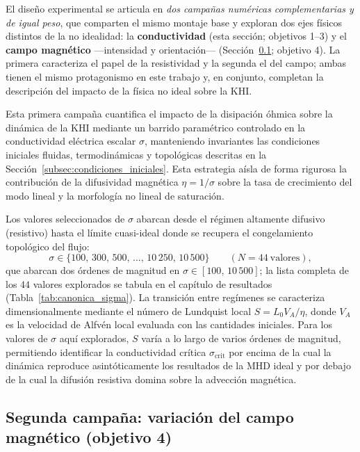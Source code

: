 \primerparrafo El diseño experimental se articula en \emph{dos campañas numéricas complementarias y de igual peso}, que comparten el mismo montaje base y exploran dos ejes físicos distintos de la no idealidad: la \textbf{conductividad} (esta sección; objetivos 1--3) y el \textbf{campo magnético} ---intensidad y orientación--- (Sección~\ref{subsec:campana_B}; objetivo 4). La primera caracteriza el papel de la resistividad y la segunda el del campo; ambas tienen el mismo protagonismo en este trabajo y, en conjunto, completan la descripción del impacto de la física no ideal sobre la KHI.

Esta primera campaña cuantifica el impacto de la disipación óhmica sobre la dinámica de la KHI mediante un barrido paramétrico controlado en la conductividad eléctrica escalar $\sigma$, manteniendo invariantes las condiciones iniciales fluidas, termodinámicas y topológicas descritas en la Sección~\ref{subsec:condiciones_iniciales}. Esta estrategia aísla de forma rigurosa la contribución de la difusividad magnética $\eta = 1/\sigma$ sobre la tasa de crecimiento del modo lineal y la morfología no lineal de saturación.

Los valores seleccionados de $\sigma$ abarcan desde el régimen altamente difusivo (resistivo) hasta el límite cuasi-ideal donde se recupera el congelamiento topológico del flujo:
\begin{equation}
    \sigma \in \{100,\, 300,\, 500,\, \ldots,\, 10\,250,\, 10\,500\}
    \qquad (N = 44\ \text{valores}),
    \label{eq:sigma_sweep}
\end{equation}
que abarcan dos órdenes de magnitud en $\sigma \in [100,\, 10\,500]$; la lista
completa de los $44$ valores explorados se tabula en el capítulo de resultados
(Tabla~\ref{tab:canonica_sigma}). La transición entre regímenes se caracteriza dimensionalmente mediante el número de Lundquist local $S = L_0 V_A / \eta$, donde $V_A$ es la velocidad de Alfvén local evaluada con las cantidades iniciales. Para los valores de $\sigma$ aquí explorados, $S$ varía a lo largo de varios órdenes de magnitud, permitiendo identificar la conductividad crítica $\sigma_{\text{crit}}$ por encima de la cual la dinámica reproduce asintóticamente los resultados de la MHD ideal y por debajo de la cual la difusión resistiva domina sobre la advección magnética.

\subsection{Segunda campaña: variación del campo magnético (objetivo 4)}
\label{subsec:campana_B}

